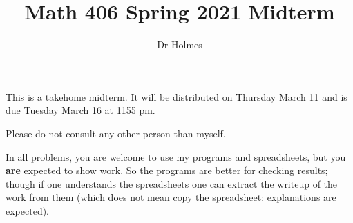 \documentclass[12pt]{article}
\title{Math 406 Spring 2021 Midterm}
\author{Dr Holmes}
\begin{document}
\maketitle

This is a takehome midterm.  It will be distributed on Thursday March 11 and is due Tuesday March 16 at 1155 pm.

Please do not consult any other person than myself.

In all problems, you are welcome to use my programs and spreadsheets, but you {\bf are} expected to show work.  So the programs are better for checking results;  though if one understands the spreadsheets one can extract the writeup of the work from them (which does not mean copy the spreadsheet:  explanations are expected).

\newpage
\end{document}
